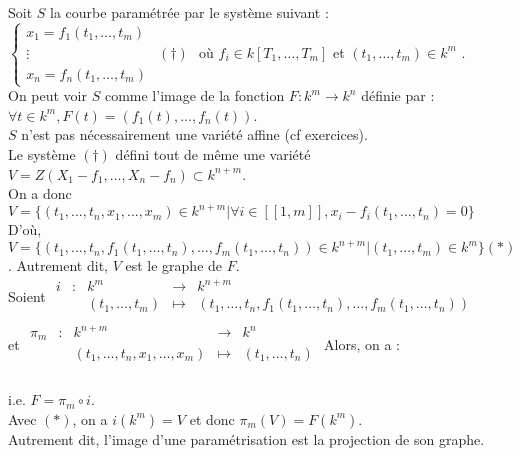 Soit $S$ la courbe paramétrée par le système suivant : $\begin{cases}
x_1=f_1(t_1,\ldots,t_m) \\
\vdots& (\dagger) \\
x_n=f_n(t_1,\ldots,t_m)
\end{cases}$ où $f_i \in k[T_1,\ldots,T_m]$ et $(t_1,\ldots,t_m) \in k^m$ .\\
On peut voir $S$ comme l'image de la fonction $F : k^m \to k^n$ définie par : \\
$\forall t \in k^m, F(t)=(f_1(t),\ldots,f_n(t))$.\\
$S$ n'est pas nécessairement une variété affine (cf exercices).\\
Le système $(\dagger)$ défini tout de même une variété $V=Z(X_1-f_1,\ldots,X_n-f_n) \subset k^{n+m}$.\\
On a donc $V=\{(t_1,\ldots,t_n,x_1,\ldots,x_m)\in k^{n+m} | \forall i \in [\![1,m]\!],x_i-f_i(t_1,\ldots,t_n)=0 \}$\\
D'où,  $V=\{(t_1,\ldots,t_n,f_1(t_1,\ldots,t_n),\ldots,f_m(t_1,\ldots,t_n))\in k^{n+m} | (t_1,\ldots,t_m) \in k^m \} (*)$. Autrement dit, $V$ est le graphe de $F$.\\
Soient $\begin{array}{ccccc}
i & : & k^m & \to & k ^{n+m} \\
 & & (t_1,\ldots,t_m) & \mapsto & (t_1,\ldots,t_n,f_1(t_1,\ldots,t_n),\ldots,f_m(t_1,\ldots,t_n))\\
\end{array}$\\
 et $\begin{array}{ccccc}
\pi_m & : & k^{n+m} & \to & k^n \\
 & & (t_1,\ldots,t_n,x_1,\ldots,x_m) & \mapsto & (t_1,\ldots,t_n) \\
\end{array}$
Alors, on a : \\
 \\
i.e. $F=\pi_m \circ i$.\\
Avec $(*)$, on a $i(k^m)=V$ et donc $\pi_m(V)=F(k^m)$.\\
Autrement dit, l'image d'une paramétrisation est la projection de son graphe.
